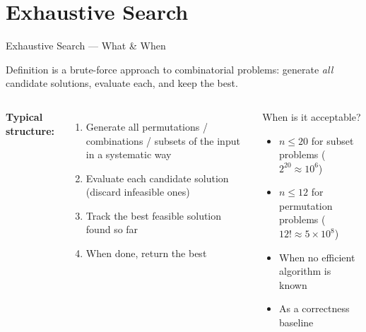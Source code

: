 \documentclass[aspectratio=169]{beamer}
\begin{document}
\section{Exhaustive Search}

\begin{frame}[shrink=12]{Exhaustive Search — What \& When}
  \begin{block}{Definition}
     is a brute-force approach to combinatorial
    problems: generate \emph{all} candidate solutions, evaluate each,
    and keep the best.
  \end{block}
  \vspace{0.4em}
  \begin{columns}[T]
      \textbf{Typical structure:}
      \begin{enumerate}
        \item Generate all permutations / combinations / subsets
              of the input in a systematic way
        \item Evaluate each candidate solution
              (discard infeasible ones)
        \item Track the best feasible solution found so far
        \item When done, return the best
      \end{enumerate}
      \begin{alertblock}{When is it acceptable?}
        \begin{itemize}
          \item $n \leq 20$ for subset problems ($2^{20}\approx10^6$)
          \item $n \leq 12$ for permutation problems ($12!\approx5\times10^8$)
          \item When no efficient algorithm is known
          \item As a correctness baseline
        \end{itemize}
      \end{alertblock}
  \end{columns}
\end{frame}
\end{document}
